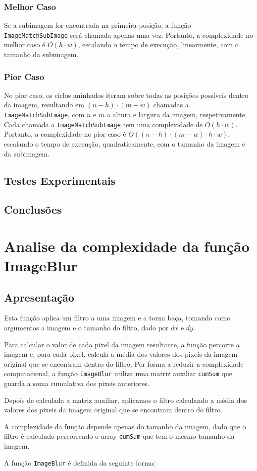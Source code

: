 \documentclass{report}
\begin{document}
\subsubsection{Melhor Caso}
Se a subimagem for encontrada na primeira posição, a função \texttt{ImageMatchSubImage} será chamada apenas uma vez. 
Portanto, a complexidade no melhor caso é \(O(h \cdot w)\), escalando o tempo de execução, linearmente, com o tamanho da subimagem.

\subsubsection{Pior Caso}
No pior caso, os ciclos aninhados iteram sobre todas as posições possíveis dentro da imagem, 
resultando em \((n-h) \cdot (m-w)\) chamadas a \texttt{ImageMatchSubImage}, com \(n\) e \(m\) a altura e largura da imagem, respetivamente. 
Cada chamada a \texttt{ImageMatchSubImage} tem uma complexidade de \(O(h \cdot w)\).
Portanto, a complexidade no pior caso é \(O((n-h) \cdot (m-w) \cdot h \cdot w)\), escalando o tempo de execução, quadraticamente, 
com o tamanho da imagem e da subimagem.

\subsection{Testes Experimentais}




\subsection{Conclusões}


\section{Analise da complexidade da função ImageBlur}

\subsection{Apresentação}
Esta função aplica um filtro a uma imagem e a torna baça, tomando como argumentos a imagem e o tamanho do filtro, dado por \(dx\) e \(dy\).
\par
Para calcular o valor de cada pixel da imagem resultante, a função percorre a imagem e, para cada pixel,
calcula a média dos valores dos pixeis da imagem original que se encontram dentro do filtro. Por forma a reduzir a complexidade computacional,
a função \texttt{ImageBlur} utiliza uma matriz auxiliar \texttt{cumSum} que guarda a soma cumulativa dos pixeis anteriores.
\par
Depois de calculada a matriz auxiliar, aplicamos o filtro calculando a média dos valores dos pixeis da imagem original que se encontram dentro do filtro.
\par
A complexidade da função depende apenas do tamanho da imagem, dado que o filtro é calculado percorrendo o array \texttt{cumSum} 
que tem o mesmo tamanho da imagem.
\par
A função \texttt{ImageBlur} é definida da seguinte forma:
\end{document}
